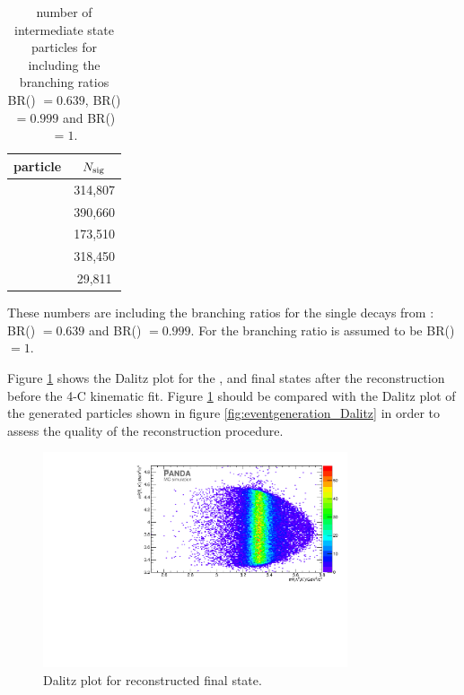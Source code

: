 	 \begin{table}
		\centering
		\caption{number of intermediate state particles for \mychannel including the branching ratios BR(\decay{\alam}{\piplus}{\antiproton}) $=0.639$, BR(\decay{\anticascade}{\alam}{\piplus})
		 $= 0.999$ and BR(\decay{\excitedanticascade}{\alam}{\kplus}) $=1$.}
		 \label{tab:nsig_cc}
		 
		 \begin{tabular}{lc}
		 	\hline
		 	particle & $N_{\textnormal{sig}}$ \\\hline
		 	\hline
		 	\lam & 314,807 \\
		 	\alam & 390,660 \\ 
		 	\cascade & 173,510 \\ 
		 	\excitedanticascade & 318,450 \\
		 	\excitedanticascade \cascade &  29,811\\\hline 
		 	
		 \end{tabular}
	\end{table}
	
	 
	
	These numbers are including the branching ratios for the single decays from \cite{PDG}: BR() $=0.639$ 
	and BR(\decay{\cascade}{\lam}{\piminus}) $= 0.999$. 
	For \excitedcascade the branching ratio is assumed to be BR(\decay{\excitedcascade}{\lam}{\kminus}) $=1$. 
	
	Figure \ref{fig:reco_Dalitzplot} shows the Dalitz plot for the \anticascade, \lam and \kminus final states after the reconstruction before the 4-C kinematic fit. 
	Figure \ref{fig:reco_Dalitzplot} should be compared with the Dalitz plot of the generated particles shown in figure \ref{fig:eventgeneration_Dalitz}
	in order to assess the quality of the reconstruction procedure.
	
	\begin{figure}
		\centering
		\includegraphics[width=0.8\textwidth]{./plots/pbarp/Dalitzplot_reco.pdf}
		\caption{\propose Dalitz plot for reconstructed \anticascade\lam\kminus final state.}
		\label{fig:reco_Dalitzplot}
	
	\end{figure}
	
	